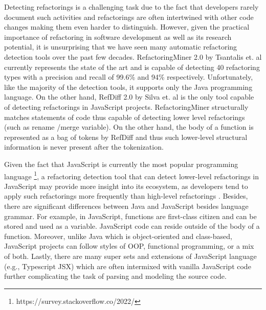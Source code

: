 \documentclass[letterpaper,12pt,onecolumn,final]{report}
\begin{document}
Detecting refactorings is a challenging task due to the fact that developers rarely document such activities \cite{alomar2021refactoring} and refactorings are often intertwined with other code changes making them even harder to distinguish. However, given the practical importance of refactoring in software development as well as its research potential, it is unsurprising that we have seen many automatic refactoring detection tools over the past few decades. RefactoringMiner 2.0 by Tsantalis et. al \cite{Tsantalis2020} currently represents the state of the art and is capable of detecting 40 refactoring types with a precision and recall of 99.6\% and 94\% respectively.  Unfortunately, like the majority of the detection tools, it supports only the Java programming language. On the other hand, RefDiff 2.0 by Silva et. al  \cite{Silva2020} is the only tool capable of detecting refactorings in JavaScript projects. RefactoringMiner structurally matches statements of code thus capable of detecting lower level refactorings (such as rename /merge variable). On the other hand, the body of a function is represented as a bag of tokens by RefDiff and thus such lower-level structural information is never present after the tokenization.

Given the fact that JavaScript is currently the most popular programming language \footnote{https://survey.stackoverflow.co/2022/}, a refactoring detection tool that can detect lower-level refactorings in JavaScript may provide more insight into its ecosystem, as developers tend to apply such refactorings more frequently than high-level refactorings \cite{MurphyHill2012}. Besides, there are significant differences between Java and JavaScript besides language grammar. For example, in JavaScript, functions are first-class citizen and can be stored and used as a variable. JavaScript code can reside outside of the body of a function. Moreover, unlike Java which is object-oriented and class-based, JavaScript projects can follow styles of OOP, functional programming, or a mix of both. Lastly, there are many super sets and extensions of JavaScript language (e.g., Typescript JSX) which are often intermixed with vanilla JavaScript code further complicating the task of parsing and modeling the source code.
\end{document}
